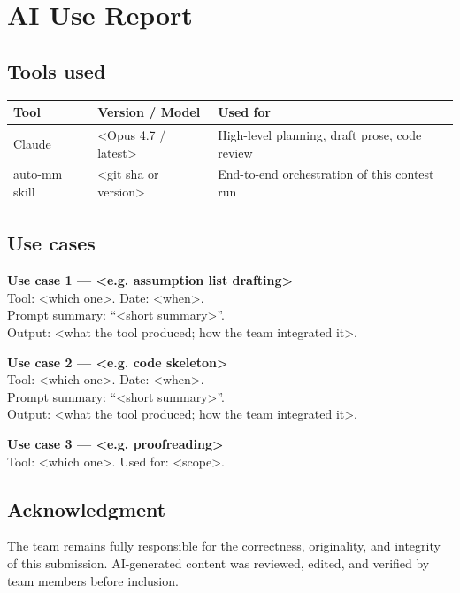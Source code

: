 
\clearpage
\section*{AI Use Report}
\label{sec:ai_report}

\subsection*{Tools used}

\begin{tabular}{l l l}
    \hline
    Tool & Version / Model & Used for \\
    \hline
    Claude & <Opus 4.7 / latest> & High-level planning, draft prose, code review \\
    auto-mm skill & <git sha or version> & End-to-end orchestration of this contest run \\
    \hline
\end{tabular}

\subsection*{Use cases}

\textbf{Use case 1 — <e.g. assumption list drafting>}\\
Tool: <which one>. Date: <when>.\\
Prompt summary: ``<short summary>''.\\
Output: <what the tool produced; how the team integrated it>.

\textbf{Use case 2 — <e.g. code skeleton>}\\
Tool: <which one>. Date: <when>.\\
Prompt summary: ``<short summary>''.\\
Output: <what the tool produced; how the team integrated it>.

\textbf{Use case 3 — <e.g. proofreading>}\\
Tool: <which one>. Used for: <scope>.


\subsection*{Acknowledgment}

The team remains fully responsible for the correctness, originality, and
integrity of this submission. AI-generated content was reviewed, edited,
and verified by team members before inclusion.
